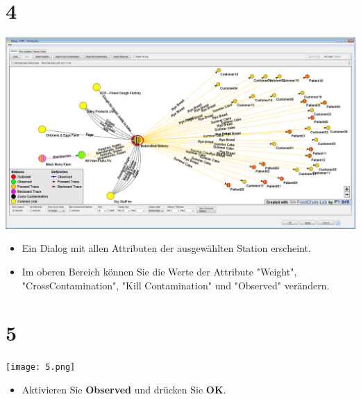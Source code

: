 \documentclass{beamer}
\begin{document}
\section{4}
\begin{frame}
	\begin{center}
  		\includegraphics[height=0.6\textheight]{4.png}
	\end{center}
	\begin{itemize}
		\item Ein Dialog mit allen Attributen der ausgewählten Station erscheint.
		\item Im oberen Bereich können Sie die Werte der Attribute "Weight", "CrossContamination", "Kill Contamination" und "Observed" verändern.
	\end{itemize}
\end{frame}

\section{5}
\begin{frame}
	\begin{center}
  		\texttt{[image: 5.png]}
	\end{center}
	\begin{itemize}
		\item Aktivieren Sie \textbf{Observed} und drücken Sie \textbf{OK}.
	\end{itemize}
\end{frame}
\end{document}
